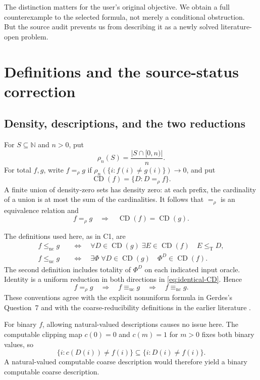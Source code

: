 \documentclass[11pt,a4paper]{article}
\newcommand{\N}{\mathbb N}
\newcommand{\leT}{\leq_{\mathrm T}}
\newcommand{\CD}{\operatorname{CD}}
\newcommand{\nc}{\mathrm{nc}}
\newcommand{\uc}{\mathrm{uc}}
\theoremstyle{definition}\newtheorem{definition}[theorem]{Definition}
\theoremstyle{remark}\newtheorem{remark}[theorem]{Remark}
\begin{document}
The distinction matters for the user's original objective. We obtain a full
counterexample to the selected formula, not merely a conditional obstruction.
But the source audit prevents us from describing it as a newly solved
literature-open problem.

\section{Definitions and the source-status correction}
\label{sec:audit}

\subsection{Density, descriptions, and the two reductions}
For $S\subseteq\N$ and $n>0$, put
\[
 \rho_n(S)=\frac{|S\cap[0,n)|}{n}.
\]
For total $f,g$, write $f=_{\rho}g$ if
$\rho_n(\{i:f(i)\ne g(i)\})\to0$, and put
\[
                     \CD(f)=\{D:D=_{\rho}f\}.
\]
A finite union of density-zero sets has density zero: at each prefix, the
cardinality of a union is at most the sum of the cardinalities. It follows
that $=_{\rho}$ is an equivalence relation and
\begin{equation}\label{eq:identical-CD}
                f=_{\rho}g\quad\Longrightarrow\quad\CD(f)=\CD(g).
\end{equation}

The definitions used here, as in C1, are
\begin{align*}
 f\leq_{\nc}g
 &\quad\Longleftrightarrow\quad
   \forall D\in\CD(g)\;\exists E\in\CD(f)\quad E\leT D,\\
 f\leq_{\uc}g
 &\quad\Longleftrightarrow\quad
   \exists\Phi\;\forall D\in\CD(g)\quad\Phi^D\in\CD(f).
\end{align*}
The second definition includes totality of $\Phi^D$ on each indicated input
oracle. Identity is a uniform reduction in both directions in
\eqref{eq:identical-CD}. Hence
\begin{equation}\label{eq:equiv-inclusions}
          f=_{\rho}g\quad\Longrightarrow\quad
          f\equiv_{\uc}g\quad\Longrightarrow\quad f\equiv_{\nc}g.
\end{equation}
These conventions agree with the explicit nonuniform formula in Gerdes's
Question~7 and with the coarse-reducibility definitions in the earlier
literature \cite{Gerdes,HJKS}.

For binary $f$, allowing natural-valued descriptions causes no issue here.
The computable clipping map $c(0)=0$ and $c(m)=1$ for $m>0$ fixes both binary
values, so
\[
 \{i:c(D(i))\ne f(i)\}\subseteq\{i:D(i)\ne f(i)\}.
\]
A natural-valued computable coarse description would therefore yield a binary
computable coarse description.
\end{document}
